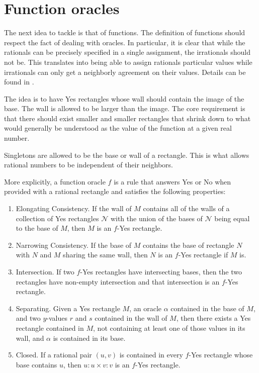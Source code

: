 \documentclass[12pt]{article}
\begin{document}
\section{Function oracles}

The next idea to tackle is that of functions. The definition of functions should respect the fact of dealing with oracles.  In particular, it is clear that while the rationals can be precisely specified in a single assignment, the irrationals should not be. This translates into being able to assign rationals particular values while irrationals can only get a neighborly agreement on their values. Details can be found in \cite{taylor23funora}.

The idea is to have Yes rectangles whose wall should contain the image of the base. The wall is allowed to be larger than the image. The core requirement is that there should exist smaller and smaller rectangles that shrink down to what would generally be understood as the value of the function at a given real number. 

Singletons are allowed to be the base or wall of a rectangle. This is what allows rational numbers to be independent of their neighbors.

More explicitly, a function oracle $f$ is a rule that answers Yes or No when provided with a rational rectangle and satisfies the following properties: 
\begin{enumerate}
    \item Elongating Consistency. If the wall of $M$ contains all of the walls of a collection of Yes rectangles $\mathcal{N}$ with the union of the bases of $\mathcal{N}$ being equal to the base of $M$, then $M$ is an $f$-Yes rectangle.
    \item Narrowing Consistency. If the base of  $M$ contains the base of rectangle $N$ with $N$ and $M$ sharing the same wall, then $N$ is an $f$-Yes rectangle if $M$ is.  
    \item Intersection. If two $f$-Yes rectangles have intersecting bases, then the two rectangles have non-empty intersection and that intersection is an $f$-Yes rectangle. 
    \item Separating. Given a Yes rectangle $M$, an oracle $\alpha$ contained in the base of $M$, and two $y$-values $r$ and $s$ contained in the wall of $M$, then there exists a Yes rectangle contained in $M$, not containing at least one of those values in its wall, and $\alpha$ is contained in its base.
    \item Closed. If a rational pair $(u,v)$ is contained in every $f$-Yes rectangle whose base contains $u$, then $u:u \times v:v$ is an $f$-Yes rectangle. 
\end{enumerate} 
\end{document}
